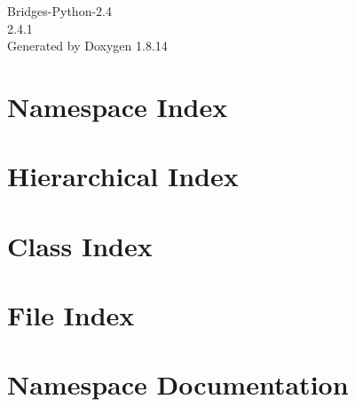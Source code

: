 \documentclass[twoside]{book}
\newcommand{\+}{\discretionary{\mbox{\scriptsize$\hookleftarrow$}}{}{}}
\newcommand{\clearemptydoublepage}{%
  \newpage{\pagestyle{empty}\cleardoublepage}%
}
\begin{document}
\hypersetup{pageanchor=false,
             bookmarksnumbered=true,
             pdfencoding=unicode
            }
\begin{titlepage}
\vspace*{7cm}
\begin{center}%
{\Large Bridges-\/\+Python-\/2.4 \\[1ex]\large 2.\+4.\+1 }\\
\vspace*{1cm}
{\large Generated by Doxygen 1.8.14}\\
\end{center}
\end{titlepage}
\clearemptydoublepage
{}
\tableofcontents
\clearemptydoublepage
{}
\hypersetup{pageanchor=true}

\chapter{Namespace Index}

\chapter{Hierarchical Index}

\chapter{Class Index}

\chapter{File Index}

\chapter{Namespace Documentation}





























\end{document}
